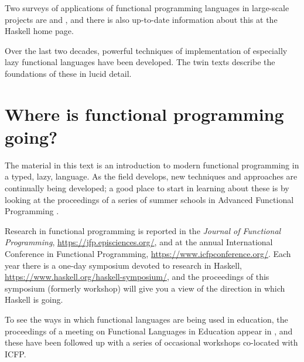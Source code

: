 Two surveys of applications of functional programming languages in
large-scale projects are  and , and
there is also up-to-date information about this at the Haskell home page.

Over the last two decades, powerful techniques of implementation of especially
lazy functional languages have been developed. The twin texts
\cite{pj,pj-lester} describe the foundations of these in lucid detail.

\section*{Where is functional programming going?}

The material in this text is an introduction to modern functional
programming in a typed, lazy, language. As the field develops, new
techniques and approaches are continually being developed; a good place
to start in learning about these is by looking at the proceedings of a series of summer
schools in Advanced Functional Programming
\cite{advancedFP,advancedFP2,advancedFP3,advancedFP4,advancedFP5,advancedFP6}. 

Research in functional programming is reported in the {\em Journal
of Functional Programming}, \url{https://jfp.episciences.org/},
and at the annual
International Conference in Functional Programming, \url{https://www.icfpconference.org/}.
Each year there is a one-day symposium devoted to research in Haskell, \url{https://www.haskell.org/haskell-symposium/},
and the proceedings of this symposium (formerly workshop) will give you a view of the direction in which Haskell is going.

To see the ways in which functional
languages are being used in education, the proceedings of a meeting on
Functional Languages in Education appear in , and these
have been followed up with a series of occasional workshops co-located with ICFP.


